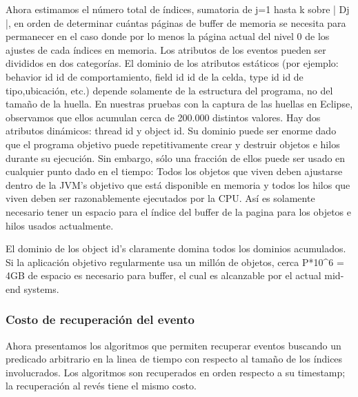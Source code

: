 \documentclass[12pt,a4paper]{report}
\begin{document}
	Ahora estimamos el número total de índices, sumatoria de j=1 hasta k sobre | Dj |, en orden de determinar cuántas páginas de buffer de memoria se necesita para permanecer en el caso donde por lo menos la página actual del nivel 0 de los ajustes de cada índices en memoria.  Los atributos de los eventos pueden ser divididos en dos categorías.  El dominio de los atributos estáticos (por ejemplo: behavior id {id de comportamiento}, field id {id de la celda}, type id {id de tipo},ubicación, etc.) depende solamente de la estructura del programa, no del tamaño de la huella.  En nuestras pruebas con la captura de las huellas en Eclipse, observamos que ellos acumulan cerca de 200.000 distintos valores.  Hay dos atributos dinámicos: thread id y object id.  Su dominio puede ser enorme dado que el programa objetivo puede repetitivamente crear y destruir objetos e hilos durante su ejecución.  Sin embargo, sólo una fracción de ellos puede ser usado en cualquier punto dado en el tiempo:  Todos los objetos que viven deben ajustarse dentro de la JVM's objetivo que está disponible en memoria y todos los hilos que viven deben ser razonablemente ejecutados por la CPU.  Así es solamente necesario tener un espacio para el índice del buffer de la pagina para los objetos e hilos usados actualmente.

	El dominio de los  object id's claramente domina todos los dominios acumulados.  Si la aplicación objetivo regularmente usa un millón de objetos, cerca P*10^6 = 4GB de espacio es necesario para buffer, el cual es alcanzable por el actual mid-end systems.


			\subsubsection{Costo de recuperación del evento}

	Ahora presentamos los algoritmos que permiten recuperar eventos buscando un predicado arbitrario en la linea de tiempo con respecto al tamaño de los índices involucrados.  Los algoritmos son recuperados en orden respecto a su timestamp; la recuperación al revés tiene el mismo costo.
\end{document}
